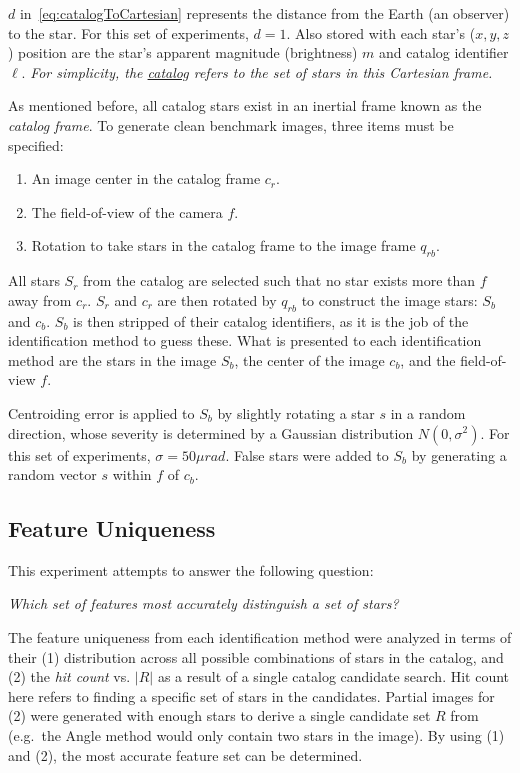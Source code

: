 $d$ in~\autoref{eq:catalogToCartesian} represents the distance from the Earth (an observer) to the star.
For this set of experiments, $d = 1$.
Also stored with each star's ($x, y, z$) position are the star's apparent magnitude (brightness) $m$ and catalog
identifier $\ell$.
\textit{For simplicity, the \underline{catalog} refers to the set of stars in this Cartesian frame.}

As mentioned before, all catalog stars exist in an inertial frame known as the \textit{catalog frame}.
To generate clean benchmark images, three items must be specified:
\begin{enumerate}
    \item An image center in the catalog frame $c_r$.
    \item The field-of-view of the camera $f$.
    \item Rotation to take stars in the catalog frame to the image frame $q_{rb}$.
\end{enumerate}

All stars $S_r$ from the catalog are selected such that no star exists more than $f$ away from $c_r$.
$S_r$ and $c_r$ are then rotated by $q_{rb}$ to construct the image stars: $S_b$ and $c_b$.
$S_b$ is then stripped of their catalog identifiers, as it is the job of the identification method to guess these.
What is presented to each identification method are the stars in the image $S_b$, the center of the image $c_b$, and
the field-of-view $f$.

Centroiding error is applied to $S_b$ by slightly rotating a star $s$ in a random direction, whose severity is
determined by a Gaussian distribution $N(0, \sigma^2)$.
For this set of experiments, $\sigma = 50\mu rad$.
False stars were added to $S_b$ by generating a random vector $s$ within $f$ of $c_b$.

\subsection{Feature Uniqueness}\label{subsec:featureUniquenessMethods}
This experiment attempts to answer the following question:
\begin{displayquote}
    \textit{Which set of features most accurately distinguish a set of stars?}
\end{displayquote}

The feature uniqueness from each identification method were analyzed in terms of their (1) distribution across all
possible combinations of stars in the catalog, and (2) the \textit{hit count} vs. $|R|$ as a result of a single
catalog candidate search.
Hit count here refers to finding a specific set of stars in the candidates.
Partial images for (2) were generated with enough stars to derive a single candidate set $R$ from (e.g.\ the Angle
method would only contain two stars in the image).
By using (1) and (2), the most accurate feature set can be determined.

